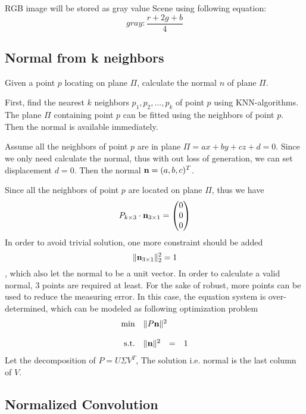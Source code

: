 RGB image will be stored as gray value Scene using following equation:
\[ gray: \frac{r+2g+b}{4}  \]


\subsection{Normal from k neighbors}

Given a point $ p $ locating on plane $ \Pi $, calculate the normal $ n $ of plane $ \Pi $. 

First, find the nearest $ k $ neighbors $ p_1,p_2,...,p_k $ of point $ p $ using KNN-algorithms. 
The plane $ \Pi $ containing point $ p $ can be fitted using the neighbors of point $ p $. 
Then the normal is available immediately.

Assume all the neighbors of point $ p $ are in plane $ \Pi = ax+by+cz+d=0 $. Since we only need calculate the normal, thus with out loss of generation, we can set displacement $ d = 0 $. Then the normal $  \textbf{n} = (a,b,c)^T  $.

Since all the neighbors of point $ p $ are located on plane $ \Pi $, thus we have 
\[ 
P_{k \times 3} \cdot  \textbf{n}_{3 \times 1} = \left(
\begin{matrix}
0 \\
0\\
0
\end{matrix}  \right) \]
In order to avoid trivial solution, one more constraint should be added
\[ \|  \textbf{n}_{3 \times 1} \|_2^2 = 1  \], which also let the normal to be a unit vector.
In order to calculate a valid normal, 3 points are required at least. For the sake of robust, more points can be used to reduce the measuring error. In this case, the equation system is over-determined, which can be modeled as following optimization problem
\begin{equation}
	\begin{array}{rrclcl}
		\displaystyle \min & \multicolumn{3}{l}{\| P  \bn \|^2} \\
		\\
		\textrm{s.t.} & \| \bn \|^2 & = & 1 
	\end{array}
\end{equation}
Let the decomposition of $ P=U\Sigma V^T $, The solution i.e. normal is the last column of $ V $.


\subsection{Normalized Convolution}




